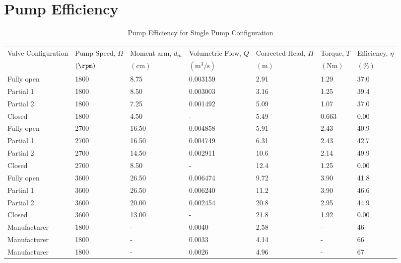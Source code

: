 \section{Pump Efficiency}
\label{sec:pump_efficiency}

\begin{longtable}{lC{0.10\textwidth}C{0.10\textwidth}C{0.10\textwidth}C{0.10\textwidth}C{0.10\textwidth}C{0.10\textwidth}}
    \caption{Pump Efficiency for Single Pump Configuration} \\
    \label{tab:pump_efficiency} \\[-8ex]
    \toprule
    Valve Configuration & Pump Speed, $\Omega$ & Moment arm, $d_m$ & Volumetric Flow, $Q$ & Corrected Head, $H$ & Torque, $T$ & Efficiency, $\eta$ \\
    & $(\unit{\rpm})$ & $(\unit{\centi\meter})$ & $(\unit{\meter\cubed\per\second})$ & $(\unit{\meter})$ & $(\unit{\newton\meter})$ & $(\unit{\percent})$ \\
    \midrule
    Fully open & 1800 & 8.75 & 0.003159 & 2.91 & 1.29 & 37.0 \\
    Partial 1 & 1800 & 8.50 & 0.003003 & 3.16 & 1.25 & 39.4 \\
    Partial 2 & 1800 & 7.25 & 0.001492 & 5.09 & 1.07 & 37.0 \\
    Closed & 1800 & 4.50 & - & 5.49 & 0.663 & 0.00 \\
    Fully open & 2700 & 16.50 & 0.004858 & 5.91 & 2.43 & 40.9 \\
    Partial 1 & 2700 & 16.50 & 0.004749 & 6.31 & 2.43 & 42.7 \\
    Partial 2 & 2700 & 14.50 & 0.002911 & 10.6 & 2.14 & 49.9 \\
    Closed & 2700 & 8.50 & - & 12.4 & 1.25 & 0.00 \\
    Fully open & 3600 & 26.50 & 0.006474 & 9.72 & 3.90 & 41.8 \\
    Partial 1 & 3600 & 26.50 & 0.006240 & 11.2 & 3.90 & 46.6 \\
    Partial 2 & 3600 & 20.00 & 0.002454 & 20.8 & 2.95 & 44.9 \\
    Closed & 3600 & 13.00 & - & 21.8 & 1.92 & 0.00 \\
    Manufacturer & 1800 & - & 0.0040 & 2.58 & - & 46 \\
    Manufacturer & 1800 & - & 0.0033 & 4.14 & - & 66 \\
    Manufacturer & 1800 & - & 0.0026 & 4.96 & - & 67 \\

\end{longtable}
